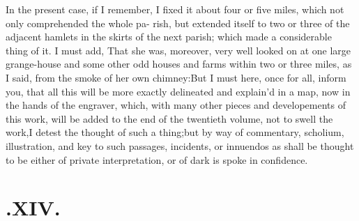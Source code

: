 \documentclass{article}
\begin{document}
In the present case, if I remember, I fixed it about four or
five miles, which not only comprehended the whole pa- 
rish, but extended itself to two or three\break
of the adjacent hamlets in the skirts of 
the next parish; which made a consider\-able
thing of it. I must add, That she
was, moreover, very well looked on at
one large grange-house and some other 
odd houses and farms within two or
three miles, as I said, from the smoke of 
her own chimney:\tsh But I must here, 
once for all, inform you, that all this will
be more exactly delineated and explain’d
in a map, now in the hands of the en\-graver, 
which, with many other pieces 
and developements of this work, will be
added to the end of the twentieth vo\-lume,
\tsk not to swell the work,\tsk I detest
the thought of such a thing;\tsk but by 
way of commentary, scholium, illustra\-tion, 
and key to such passages, incidents, 
or innuendos as shall be thought to be ei\-ther of
private interpretation, or of dark 
is spoke in confidence.

\null
\section{.\enspace XIV.}
\end{document}
